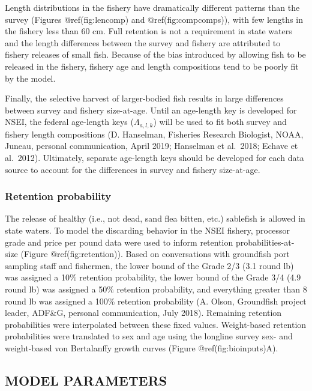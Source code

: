 \documentclass[
]{article}
\begin{document}
Length distributions in the fishery have dramatically different patterns
than the survey (Figures @ref(fig:lencomp) and @ref(fig:compcomps)),
with few lengths in the fishery less than 60 cm. Full retention is not a
requirement in state waters and the length differences between the
survey and fishery are attributed to fishery releases of small fish.
Because of the bias introduced by allowing fish to be released in the
fishery, fishery age and length compositions tend to be poorly fit by
the model.

Finally, the selective harvest of larger-bodied fish results in large
differences between survey and fishery size-at-age. Until an age-length
key is developed for NSEI, the federal age-length keys
(\(\Lambda_{a,l,k}\)) will be used to fit both survey and fishery length
compositions (D. Hanselman, Fisheries Research Biologist, NOAA, Juneau,
personal communication, April 2019; Hanselman et al.~2018; Echave et
al.~2012). Ultimately, separate age-length keys should be developed for
each data source to account for the differences in survey and fishery
size-at-age.

\hypertarget{retention-probability}{%
\subsubsection{Retention probability}\label{retention-probability}}

The release of healthy (i.e., not dead, sand flea bitten, etc.)
sablefish is allowed in state waters. To model the discarding behavior
in the NSEI fishery, processor grade and price per pound data were used
to inform retention probabilities-at-size (Figure @ref(fig:retention)).
Based on conversations with groundfish port sampling staff and
fishermen, the lower bound of the Grade 2/3 (3.1 round lb) was assigned
a 10\% retention probability, the lower bound of the Grade 3/4 (4.9
round lb) was assigned a 50\% retention probability, and everything
greater than 8 round lb was assigned a 100\% retention probability (A.
Olson, Groundfish project leader, ADF\&G, personal communication, July
2018). Remaining retention probabilities were interpolated between these
fixed values. Weight-based retention probabilities were translated to
sex and age using the longline survey sex- and weight-based von
Bertalanffy growth curves (Figure @ref(fig:bioinputs)A).

\hypertarget{model-parameters}{%
\subsection{MODEL PARAMETERS}\label{model-parameters}}
\end{document}
